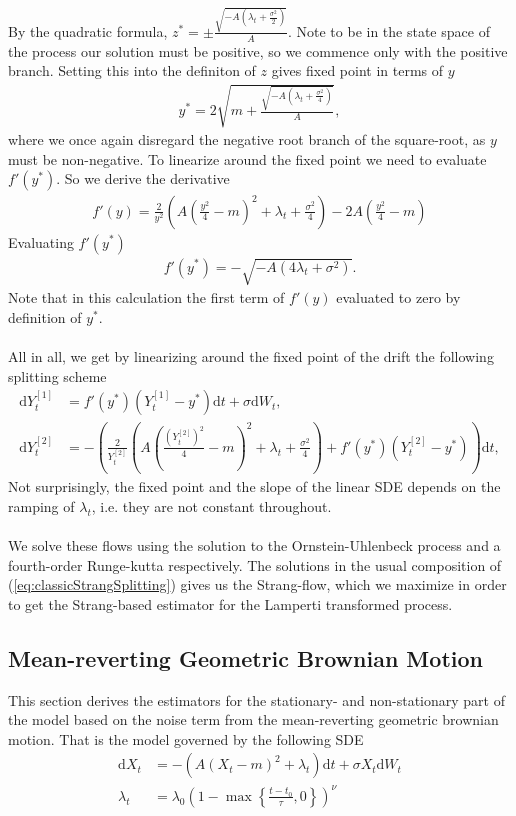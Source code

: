 By the quadratic formula, $z^* = \pm\frac{\sqrt{-A\left(\lambda_t + \frac{\sigma^2}{2}\right)}}{A}$. Note to be in the state space of the process our solution must be positive, so we commence only with the positive branch. Setting this into the definiton of $z$ gives fixed point in terms of $y$
\begin{align}
    y^* = 2\sqrt{m + \frac{\sqrt{-A\left(\lambda_t + \frac{\sigma^2}{4}\right)}}{A}},
\end{align}
where we once again disregard the negative root branch of the square-root, as $y$ must be non-negative. To linearize around the fixed point we need to evaluate $f'(y^*)$. So we derive the derivative
\begin{align}
    f'(y) = \frac{2}{y^2}\left(A\left(\frac{y^2}{4}-m\right)^2 + \lambda_t + \frac{\sigma^2}{4}\right) - 2A\left(\frac{y^2}{4} - m\right)
\end{align}
Evaluating $f'(y^*)$
\begin{align}
    f'(y^*) = -\sqrt{-A\left(4\lambda_t + \sigma^2\right)}.
\end{align}
Note that in this calculation the first term of $f'(y)$ evaluated to zero by definition of $y^*$.\\\\
All in all, we get by linearizing around the fixed point of the drift the following splitting scheme
\begin{align}
    \mathrm{d}Y_t^{[1]} &= f'(y^*)\left(Y_t^{[1]} - y^*\right)\mathrm{d}t + \sigma \mathrm{d}W_t, \label{eq:lampertiSquarerootSplitting1}\\
    \mathrm{d}Y_t^{[2]} &= - \left(\frac{2}{Y_t^{[2]}}\left(A\left(\frac{\left(Y_t^{[2]}\right)^2}{4} - m\right)^2 + \lambda_t + \frac{\sigma^2}{4}\right) + f'(y^*)\left(Y_t^{[2]} - y^*\right)\right)\mathrm{d}t,
\end{align}
Not surprisingly, the fixed point and the slope of the linear SDE depends on the ramping of $\lambda_t$, i.e. they are not constant throughout. \\\\
We solve these flows using the solution to the Ornstein-Uhlenbeck process and a fourth-order Runge-kutta respectively. The solutions in the usual composition of (\ref{eq:classicStrangSplitting}) gives us the Strang-flow, which we maximize in order to get the Strang-based estimator for the Lamperti transformed process.
\newpage
\subsection{Mean-reverting Geometric Brownian Motion}\label{subsec:meanrevertingGBM}
This section derives the estimators for the stationary- and non-stationary part of the model based on the noise term from the mean-reverting geometric brownian motion. That is the model governed by the following SDE
\begin{align}
    \mathrm{d}X_t &= -\left(A\left(X_t - m\right)^2 + \lambda_t\right)\mathrm{d}t + \sigma X_t \mathrm{d}W_t\\
    \lambda_t &= \lambda_0\left(1 - \max\left\{\frac{t - t_0}{\tau}, 0\right\}\right)^\nu
\end{align}
